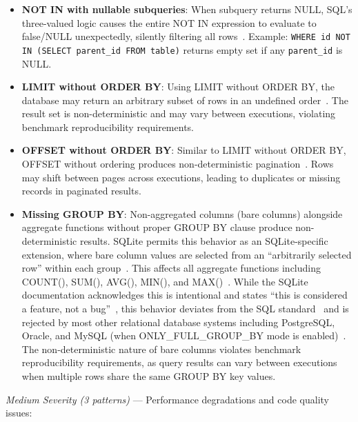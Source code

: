 \documentclass[print]{einformatica}
\begin{document}
\begin{itemize}
\item \textbf{NOT IN with nullable subqueries}: When subquery returns NULL, SQL's three-valued logic causes the entire NOT IN expression to evaluate to false/NULL unexpectedly, silently filtering all rows~\cite{karwin2010sqlantipatterns,date2012sqlrelational}. Example: \texttt{WHERE id NOT IN (SELECT parent\_id FROM table)} returns empty set if any \texttt{parent\_id} is NULL.

\item \textbf{LIMIT without ORDER BY}: Using LIMIT without ORDER BY, the database may return an arbitrary subset of rows in an undefined order~\cite{karwin2010sqlantipatterns,iso9075_2_2016}. The result set is non-deterministic and may vary between executions, violating benchmark reproducibility requirements.

\item \textbf{OFFSET without ORDER BY}: Similar to LIMIT without ORDER BY, OFFSET without ordering produces non-deterministic pagination~\cite{karwin2010sqlantipatterns,iso9075_2_2016}. Rows may shift between pages across executions, leading to duplicates or missing records in paginated results.

\item \textbf{Missing GROUP BY}: Non-aggregated columns (bare columns) alongside aggregate functions without proper GROUP BY clause produce non-deterministic results. SQLite permits this behavior as an SQLite-specific extension, where bare column values are selected from an ``arbitrarily selected row'' within each group~\cite{sqliteBareColumns}. This affects all aggregate functions including COUNT(), SUM(), AVG(), MIN(), and MAX()~\cite{sqliteBareColumns}. While the SQLite documentation acknowledges this is intentional and states ``this is considered a feature, not a bug''~\cite{sqliteBareColumns}, this behavior deviates from the SQL standard~\cite{iso9075_2_2016} and is rejected by most other relational database systems including PostgreSQL, Oracle, and MySQL (when ONLY\_FULL\_GROUP\_BY mode is enabled)~\cite{postgresGroupBy,mysqlGroupByHandling}. The non-deterministic nature of bare columns violates benchmark reproducibility requirements, as query results can vary between executions when multiple rows share the same GROUP BY key values.
\end{itemize}

\textit{Medium Severity (3 patterns)} --- Performance degradations and code quality issues:
\end{document}
